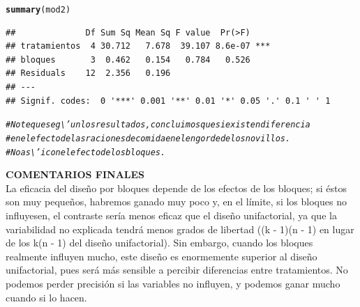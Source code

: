 \documentclass[12pt,letterpaper]{article}\usepackage[]{graphicx}\usepackage[]{color}
\makeatletter
\newcommand{\hlcom}[1]{\textcolor[rgb]{0.678,0.584,0.686}{\textit{#1}}}%
\newcommand{\hlstd}[1]{\textcolor[rgb]{0.345,0.345,0.345}{#1}}%
\newcommand{\hlkwd}[1]{\textcolor[rgb]{0.737,0.353,0.396}{\textbf{#1}}}%
\newenvironment{kframe}{%
 \def\at@end@of@kframe{}%
 \ifinner\ifhmode%
  \def\at@end@of@kframe{\end{minipage}}%
  \begin{minipage}{\columnwidth}%
 \fi\fi%
 \def\FrameCommand##1{\hskip\@totalleftmargin \hskip-\fboxsep
 \colorbox{shadecolor}{##1}\hskip-\fboxsep
     \hskip-\linewidth \hskip-\@totalleftmargin \hskip\columnwidth}%
 \MakeFramed {\advance\hsize-\width
   \@totalleftmargin\z@ \linewidth\hsize
   \@setminipage}}%
 {\par\unskip\endMakeFramed%
 \at@end@of@kframe}
\newenvironment{knitrout}{}{} %
\makeatother
\begin{document}
\begin{itemize}
\begin{knitrout}
\begin{kframe}
\begin{alltt}
\hlkwd{summary}\hlstd{(mod2)}
\end{alltt}
\begin{verbatim}
##              Df Sum Sq Mean Sq F value  Pr(>F)    
## tratamientos  4 30.712   7.678  39.107 8.6e-07 ***
## bloques       3  0.462   0.154   0.784   0.526    
## Residuals    12  2.356   0.196                    
## ---
## Signif. codes:  0 '***' 0.001 '**' 0.01 '*' 0.05 '.' 0.1 ' ' 1
\end{verbatim}
\begin{alltt}
\hlcom{# Note que seg\textbackslash{}'un los resultados, concluimos que si existen diferencia }
\hlcom{# en el efecto de las raciones de comida en el engorde de los novillos. }
\hlcom{# No as\textbackslash{}'i con el efecto de los bloques. }
\end{alltt}
\end{kframe}
\end{knitrout}
\end{itemize}

\textbf{COMENTARIOS FINALES}\\

La eficacia del dise\~no por bloques depende de los efectos de los bloques; si \'estos son muy peque\~nos, habremos ganado muy poco y, en el l\'imite, si los bloques no influyesen, el contraste ser\'ia menos eficaz que el dise\~no unifactorial, ya que la variabilidad no explicada tendr\'a menos grados de libertad ((k - 1)(n - 1) en lugar de los k(n - 1) del dise\~no unifactorial). Sin embargo, cuando los bloques realmente influyen mucho, este dise\~no es enormemente superior al dise\~no unifactorial, pues ser\'a m\'as sensible a percibir diferencias entre tratamientos. No podemos perder precisi\'on si las variables no influyen, y podemos ganar mucho cuando si lo hacen. \\
\end{document}
